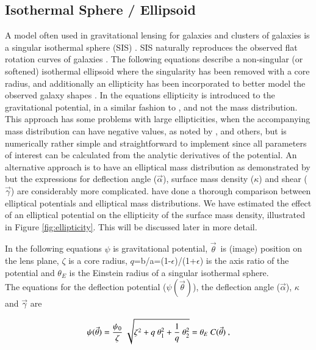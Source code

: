 \documentclass[useAMS,usenatbib]{mn2e}
\newcounter{one}   \setcounter{one}{1}
\begin{document}
\subsection{Isothermal Sphere / Ellipsoid}
A model often used in gravitational lensing for galaxies and clusters
of galaxies is a singular isothermal sphere (SIS)
\citep[e.g.][]{gott:73,turner:84}. SIS naturally reproduces the
observed flat rotation curves of galaxies
\citep[e.g.][]{roberts:73}. The following equations describe a
non-singular (or softened) isothermal ellipsoid \citep{hinshaw:87}
where the singularity has been removed with a core radius, and
additionally an ellipticity has been incorporated to better model the
observed galaxy shapes \citep{seitz:98}. In the equations ellipticity
is introduced to the gravitational potential, in a similar fashion to
\citet{kochanek:89}, and not the mass distribution. This approach has
some problems with large ellipticities, when the accompanying mass
distribution can have negative values, as noted by
\citet{blandford:87}, \citet{kormann:94} and others, but is
numerically rather simple and straightforward to implement since all
parameters of interest can be calculated from the analytic derivatives
of the potential. An alternative approach is to have an elliptical
mass distribution as demonstrated by \citet{kormann:94} but the
expressions for deflection angle ($\vec{\alpha}$), surface mass
density ($\kappa$) and shear ($\vec{\gamma}$) are considerably more
complicated. \citet{kassiola:93} have done a thorough comparison
between elliptical potentials and elliptical mass distributions. We
have estimated the effect of an elliptical potential on the
ellipticity of the surface mass density, illustrated in Figure
\ref{fig:ellipticity}. This will be discussed later in more detail.

In the following equations $\psi$ is gravitational potential,
$\vec{\theta}$~is (image) position on the lens plane, $\zeta$ is a
core radius, $q$=b/a=(1-$\epsilon$)/(1+$\epsilon$) is the axis ratio
of the potential and $\theta_{E}$ is the Einstein radius of a singular
isothermal sphere.\\

The equations for the deflection potential ($\psi(\vec{\theta})$), the
deflection angle ($\vec{\alpha}$), $\kappa$ and $\vec{\gamma}$ are

\begin{equation}
  \psi(\vec{\theta})={\psi_{0}\over\zeta}\ \sqrt{\zeta^{2}+q\ \theta_1^{2}+{1\over q}\
  \theta_2^{2}}=\theta_{E}\ C(\vec{\theta})\ ,
\end{equation}
\end{document}
